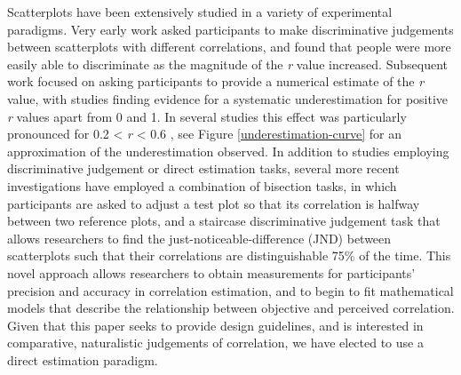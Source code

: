 \documentclass[preprint, 3p,
authoryear]{elsarticle} %
\begin{document}
Scatterplots have been extensively studied in a variety of experimental
paradigms. Very early work \citep{pollack_1960} asked participants to
make discriminative judgements between scatterplots with different
correlations, and found that people were more easily able to
discriminate as the magnitude of the \emph{r} value increased.
Subsequent work focused on asking participants to provide a numerical
estimate of the \emph{r} value, with studies finding evidence for a
systematic underestimation for positive \emph{r} values apart from 0 and
1. In several studies this effect was particularly pronounced for 0.2
\textless{} \emph{r} \textless{} 0.6
\citep{strahan_1978, bobko_1979, cleveland_1982, lane_1985, lauer_1989, collyer_1990, meyer_1992},
see Figure \ref{underestimation-curve} for an approximation of the
underestimation observed. In addition to studies employing
discriminative judgement or direct estimation tasks, several more recent
investigations have employed a combination of bisection tasks, in which
participants are asked to adjust a test plot so that its correlation is
halfway between two reference plots, and a staircase discriminative
judgement task that allows researchers to find the
just-noticeable-difference (JND) between scatterplots such that their
correlations are distinguishable 75\% of the time. This novel approach
\citep{rensink_2010} allows researchers to obtain measurements for
participants' precision and accuracy in correlation estimation, and to
begin to fit mathematical models that describe the relationship between
objective and perceived correlation. Given that this paper seeks to
provide design guidelines, and is interested in comparative,
naturalistic judgements of correlation, we have elected to use a direct
estimation paradigm.
\end{document}
